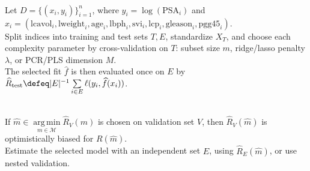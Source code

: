 \begin{example} \label{ex:sl-prostate-selection-shrinkage-workflow} \\
Let $D=\{(x_i,y_i)\}_{i=1}^n$, where $y_i=\log(\mathrm{PSA}_i)$ and $x_i=(\mathrm{lcavol}_i,\mathrm{lweight}_i,\mathrm{age}_i,\mathrm{lbph}_i,\mathrm{svi}_i,\mathrm{lcp}_i,\mathrm{gleason}_i,\mathrm{pgg45}_i)$.\\
Split indices into training and test sets $T,E$, standardize $X_T$, and choose each complexity parameter by cross-validation on $T$: subset size $m$, ridge/lasso penalty $\lambda$, or PCR/PLS dimension $M$.\\
The selected fit $\widehat{f}$ is then evaluated once on $E$ by $\widehat{R}_{\mathrm{test}}\defeq |E|^{-1}\sum\limits_{i\in E}\ell(y_i,\widehat{f}(x_i))$.
\end{example}

\begin{remark} \label{rem:sl-selection-bias} \\
If $\widehat{m}\in\operatorname*{arg\,min}\limits_{m\in\mathcal{M}}\widehat{R}_V(m)$ is chosen on validation set $V$, then $\widehat{R}_V(\widehat{m})$ is optimistically biased for $R(\widehat{m})$.\\
Estimate the selected model with an independent set $E$, using $\widehat{R}_E(\widehat{m})$, or use nested validation.
\end{remark}

